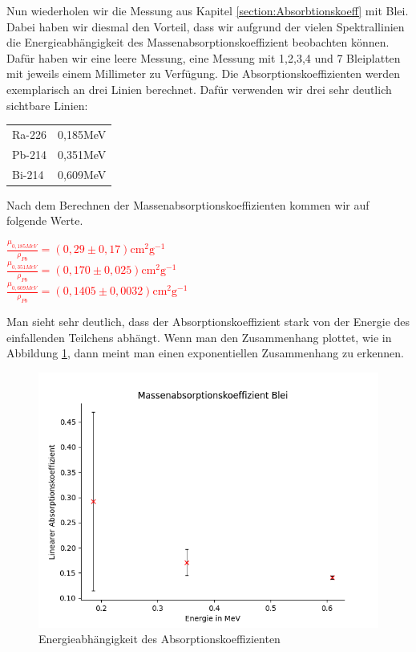 Nun wiederholen wir die Messung aus Kapitel \ref{section:Absorbtionskoeff} mit Blei. Dabei haben wir diesmal den Vorteil, dass wir aufgrund der vielen 
Spektrallinien die Energieabhängigkeit des Massenabsorptionskoeffizient beobachten können. Dafür haben wir eine leere Messung, eine Messung mit 1,2,3,4 und 7 Bleiplatten mit 
jeweils einem Millimeter zu Verfügung. Die Absorptionskoeffizienten werden exemplarisch an drei Linien berechnet. 
Dafür verwenden wir drei sehr deutlich sichtbare Linien:
\begin{center}
    \centering
    \begin{tabular}{lr}
        Ra-226 & 0,185MeV\\
        Pb-214 & 0,351MeV\\
        Bi-214 & 0,609MeV\\
    \end{tabular}
\end{center}

Nach dem Berechnen der Massenabsorptionskoeffizienten kommen wir auf folgende Werte.


\begin{center}
    \centering
    \textcolor{red}{$\frac{\mu_{0,185MeV}}{\rho_{Pb}} = (0,29\pm0,17) \mathrm{cm}^{2} \mathrm{g}^{-1}$}\\
    \textcolor{red}{$\frac{\mu_{0,351MeV}}{\rho_{Pb}}= (0,170\pm0,025) \mathrm{cm}^{2} \mathrm{g}^{-1}$}\\
    \textcolor{red}{$\frac{\mu_{0,609MeV}}{\rho_{Pb}}= (0,1405\pm0,0032) \mathrm{cm}^{2} \mathrm{g}^{-1}$}\\
\end{center}

Man sieht sehr deutlich, dass der Absorptionskoeffizient stark von der Energie des einfallenden Teilchens abhängt. Wenn man den Zusammenhang plottet, wie in Abbildung \ref{AbsEne}, dann meint man 
einen exponentiellen Zusammenhang zu erkennen.

\begin{figure}
    \centering
    \includegraphics[width = 12cm]{Bilder/Auswertung/AbsorbtionBleiEnergie.png}
    \caption{Energieabhängigkeit des Absorptionskoeffizienten}
    \label{AbsEne}
\end{figure}

